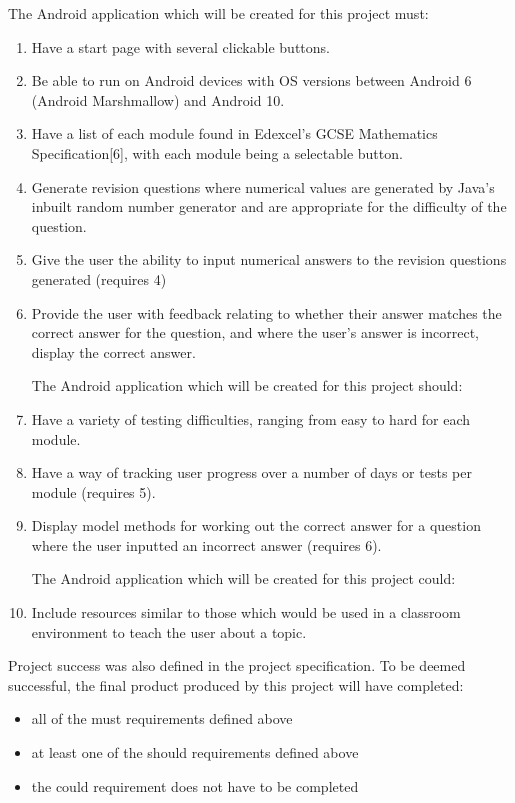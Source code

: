 \documentclass{article}
\begin{document}
The Android application which will be created for this project must: 

\begin{enumerate}
	\item Have a start page with several clickable buttons.
	\item Be able to run on Android devices with OS versions between Android 6 (Android Marshmallow) and Android 10.
	\item Have a list of each module found in Edexcel's GCSE Mathematics Specification[6], with each module being a selectable button.
	\item Generate revision questions where numerical values are generated by Java's inbuilt random number generator and are appropriate for the difficulty of the question.
	\item Give the user the ability to input numerical answers to the revision questions generated (requires 4)
	\item Provide the user with feedback relating to whether their answer matches the correct answer for the question, and where the user’s answer is incorrect, display the correct answer. \par
	
	The Android application which will be created for this project should:
	\item Have a variety of testing difficulties, ranging from easy to hard for each module.
	\item Have a way of tracking user progress over a number of days or tests per module (requires 5).
	\item Display model methods for working out the correct answer for a question where the user inputted an incorrect answer (requires 6). \par
	
	The Android application which will be created for this project could:
	\item Include resources similar to those which would be used in a classroom environment to teach the user about a topic. \par
\end{enumerate}

Project success was also defined in the project specification. To be deemed successful, the final product produced by this project will have completed: 

\begin{itemize}
	\item all of the must requirements defined above
	\item at least one of the should requirements defined above
	\item the could requirement does not have to be completed
\end{itemize}
\end{document}
